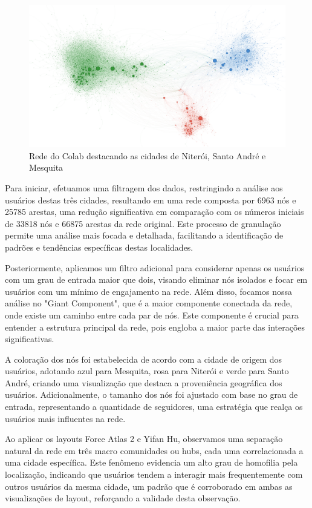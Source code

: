 \begin{figure}[!htb]
	\caption{Rede do Colab destacando as cidades de Niterói, Santo André e Mesquita}
	\label{fig:colab_graph_3_cidades}
	\centering
	\includegraphics[scale=0.20]{images/colab_graph_3_cidades.png}
	\fautor
\end{figure}

Para iniciar, efetuamos uma filtragem dos dados, restringindo a análise aos usuários destas três cidades, resultando em uma rede composta por 6963 nós e 25785 arestas, uma redução significativa em comparação com os números iniciais de 33818 nós e 66875 arestas da rede original. Este processo de granulação permite uma análise mais focada e detalhada, facilitando a identificação de padrões e tendências específicas destas localidades.

Posteriormente, aplicamos um filtro adicional para considerar apenas os usuários com um grau de entrada maior que dois, visando eliminar nós isolados e focar em usuários com um mínimo de engajamento na rede. Além disso, focamos nossa análise no "Giant Component", que é a maior componente conectada da rede, onde existe um caminho entre cada par de nós. Este componente é crucial para entender a estrutura principal da rede, pois engloba a maior parte das interações significativas.

A coloração dos nós foi estabelecida de acordo com a cidade de origem dos usuários, adotando azul para Mesquita, rosa para Niterói e verde para Santo André, criando uma visualização que destaca a proveniência geográfica dos usuários. Adicionalmente, o tamanho dos nós foi ajustado com base no grau de entrada, representando a quantidade de seguidores, uma estratégia que realça os usuários mais influentes na rede.

Ao aplicar os layouts Force Atlas 2 e Yifan Hu, observamos uma separação natural da rede em três macro comunidades ou hubs, cada uma correlacionada a uma cidade específica. Este fenômeno evidencia um alto grau de homofilia pela localização, indicando que usuários tendem a interagir mais frequentemente com outros usuários da mesma cidade, um padrão que é corroborado em ambas as visualizações de layout, reforçando a validade desta observação.

